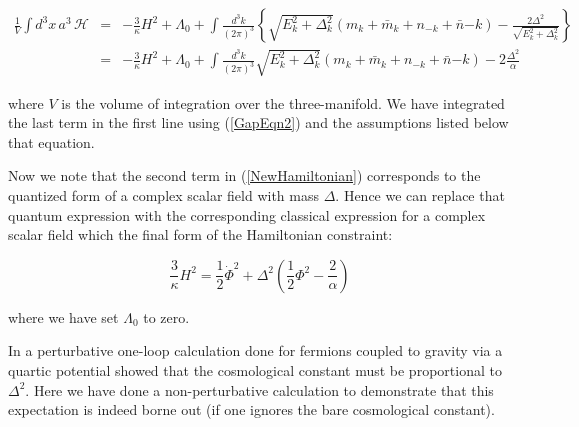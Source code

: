 \begin{doublespace}
\begin{eqnarray}\label{NewHamiltonian}
    \frac{1}{V}\int d^3x \,a^3 \,\mathcal{H} &=& -\frac{3}{\kappa}H^2 + \Lambda_0
        + \int \frac{d^3k}{(2\pi)^3} \left\{\sqrt{E_k^2 + \Delta_k^2}(m_k + \bar m_k + n_{-k} + \bar
        n{-k}) - \frac{2\Delta^2}{\sqrt{E_k^2 + \Delta_k^2}} \right\} \nonumber \\
        &=& -\frac{3}{\kappa}H^2 + \Lambda_0
        + \int \frac{d^3k}{(2\pi)^3} \sqrt{E_k^2 + \Delta_k^2}(m_k + \bar m_k + n_{-k} + \bar n{-k})
        - 2\frac{\Delta^2}{\alpha}
\end{eqnarray}

where $V$ is the volume of integration over the three-manifold. We have integrated the last term in
the first line using (\ref{GapEqn2}) and the assumptions listed below that equation.

Now we note that the second term in (\ref{NewHamiltonian}) corresponds to the quantized form of a
complex scalar field with mass $\Delta$. Hence we can replace that quantum expression with the
corresponding classical expression for a complex scalar field which the final form of the
Hamiltonian constraint:

\begin{equation}\label{FinalHamiltonian}
    \frac{3}{\kappa}H^2 = \frac{1}{2}\dot \Phi^2 + \Delta^2 \left(\frac{1}{2}\Phi^2 - \frac{2}{\alpha} \right)
\end{equation}

%


where we have set $\Lambda_0$ to zero.

In \cite{Alexander2004} a perturbative one-loop calculation done for fermions coupled to gravity
via a quartic potential showed that the cosmological constant must be proportional to $\Delta^2$.
Here we have done a non-perturbative calculation to demonstrate that this expectation is indeed
borne out (if one ignores the bare cosmological constant).


\end{doublespace}
